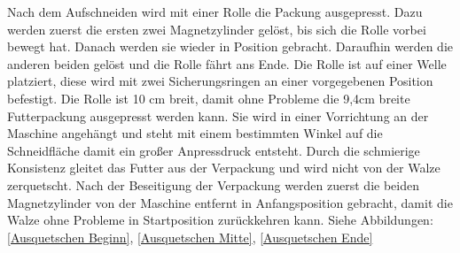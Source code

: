 Nach dem Aufschneiden wird mit einer Rolle die Packung ausgepresst. Dazu werden zuerst die ersten zwei Magnetzylinder gelöst, bis sich die Rolle vorbei bewegt hat. Danach werden sie wieder in Position gebracht. Daraufhin werden die anderen beiden gelöst und die Rolle fährt ans Ende. Die Rolle ist auf einer Welle platziert, diese wird mit zwei Sicherungsringen an einer  vorgegebenen Position befestigt. Die Rolle ist 10 cm breit, damit ohne Probleme die 9,4cm breite Futterpackung ausgepresst werden kann. Sie wird in einer Vorrichtung an der Maschine angehängt und steht mit einem bestimmten Winkel auf die Schneidfläche damit ein großer Anpressdruck entsteht. Durch die schmierige Konsistenz gleitet das Futter aus der Verpackung und wird nicht von der Walze zerquetscht. Nach der Beseitigung der Verpackung werden zuerst die beiden Magnetzylinder von der Maschine entfernt in Anfangsposition gebracht, damit die Walze ohne Probleme in Startposition zurückkehren kann. Siehe Abbildungen: \ref{Ausquetschen Beginn}, \ref{Ausquetschen Mitte}, \ref{Ausquetschen Ende}



